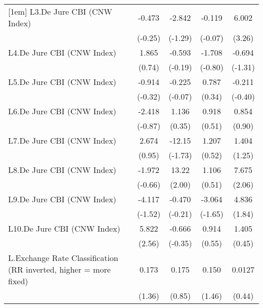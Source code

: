{\begin{tabular}{l*{4}{c}}
[1em]
L3.De Jure CBI (CNW Index)&   -0.473         &   -2.842         &   -0.119         &    6.002\sym{**} \\
                &  (-0.25)         &  (-1.29)         &  (-0.07)         &   (3.26)         \\
[1em]
L4.De Jure CBI (CNW Index)&    1.865         &   -0.593         &   -1.708         &   -0.694         \\
                &   (0.74)         &  (-0.19)         &  (-0.80)         &  (-1.31)         \\
[1em]
L5.De Jure CBI (CNW Index)&   -0.914         &   -0.225         &    0.787         &   -0.211         \\
                &  (-0.32)         &  (-0.07)         &   (0.34)         &  (-0.40)         \\
[1em]
L6.De Jure CBI (CNW Index)&   -2.418         &    1.136         &    0.918         &    0.854         \\
                &  (-0.87)         &   (0.35)         &   (0.51)         &   (0.90)         \\
[1em]
L7.De Jure CBI (CNW Index)&    2.674         &   -12.15         &    1.207         &    1.404         \\
                &   (0.95)         &  (-1.73)         &   (0.52)         &   (1.25)         \\
[1em]
L8.De Jure CBI (CNW Index)&   -1.972         &    13.22\sym{*}  &    1.106         &    7.675\sym{*}  \\
                &  (-0.66)         &   (2.00)         &   (0.51)         &   (2.06)         \\
[1em]
L9.De Jure CBI (CNW Index)&   -4.117         &   -0.470         &   -3.064         &    4.836         \\
                &  (-1.52)         &  (-0.21)         &  (-1.65)         &   (1.84)         \\
[1em]
L10.De Jure CBI (CNW Index)&    5.822\sym{*}  &   -0.666         &    0.914         &    1.405         \\
                &   (2.56)         &  (-0.35)         &   (0.55)         &   (0.45)         \\
[1em]
L.Exchange Rate Classification (RR inverted, higher = more fixed)&    0.173         &    0.175         &    0.150         &   0.0127         \\
                &   (1.36)         &   (0.85)         &   (1.46)         &   (0.44)         \\

\end{tabular}}
